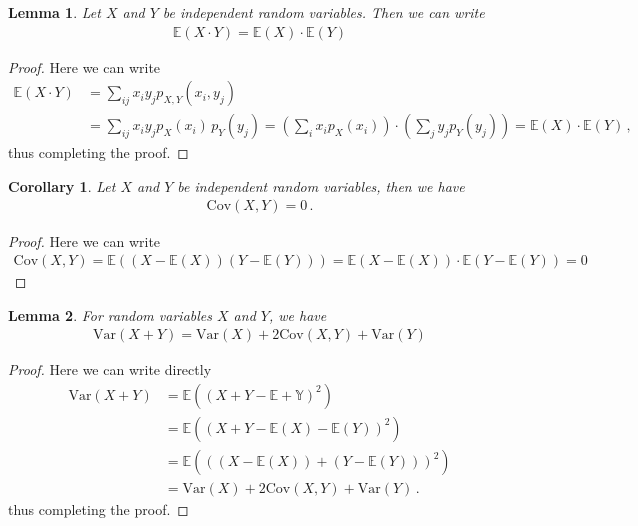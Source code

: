 \documentclass[11pt, onesided]{book}
\theoremstyle{break}
\theoremstyle{break}
\newtheorem{lem}{Lemma}[thm]
\newtheorem{cor}{Corollary}[thm]
\begin{document}
\begin{lem}
Let $X$ and $Y$ be independent random variables. Then we can write
\begin{align*}
\mathbb{E}(X\cdot Y) = \mathbb{E}(X)\cdot \mathbb{E}(Y)
\end{align*}
\end{lem}
\begin{proof}
Here we can write
\begin{align*}
\mathbb{E}(X\cdot Y)  
&= \sum_{ij}x_i y_j p_{X,Y}(x_i, y_j) \\
&= \sum_{ij}x_i y_j p_X(x_i)\, p_Y(y_j)= \left(\sum_i x_i p_X(x_i) \right)\cdot \left( \sum_j y_j p_Y(y_j)\right) = \mathbb{E}(X) \cdot \mathbb{E}(Y)\,,
\end{align*}
thus completing the proof. 
\end{proof}

\begin{cor}
Let $X$ and $Y$ be independent random variables, then we have
\begin{align*}
\text{Cov}(X,Y) = 0\,.
\end{align*}
\end{cor}
\begin{proof}
Here we can write
\begin{align*}
\text{Cov}(X,Y) = \mathbb{E}((X-\mathbb{E}(X) ) (Y - \mathbb{E}(Y))) = \mathbb{E}(X- \mathbb{E}(X)) \cdot \mathbb{E}(Y - \mathbb{E}(Y)) = 0
\end{align*}
\end{proof}

\begin{lem}
For random variables $X$ and $Y$, we have
\begin{align*}
\text{Var}(X+Y)  =  \text{Var}(X) + 2\text{Cov}(X,Y) + \text{Var}(Y)
\end{align*}
\end{lem}
\begin{proof}
Here we can write directly
\begin{align*}
\text{Var}(X+Y) 
&= \mathbb{E}\left(\left(X+Y - \mathbb{E+Y}\right)^2 \right) \\
&= \mathbb{E}\left( \left(X+Y - \mathbb{E}(X) - \mathbb{E}(Y) \right)^2 \right)\\
&= \mathbb{E}\left( \left((X-\mathbb{E}(X)) + (Y-\mathbb{E}(Y))\right)^2 \right)\\
&= \text{Var}(X) + 2\text{Cov}(X,Y) + \text{Var}(Y)\,.
\end{align*}
thus completing the proof.
\end{proof}
\end{document}

